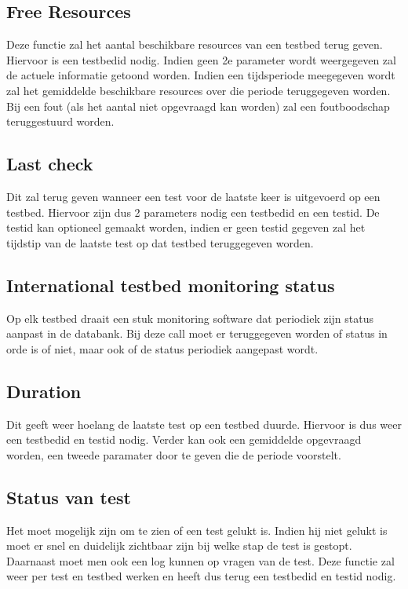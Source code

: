 \documentclass[11pt]{article}
\begin{document}
\subsection{Free Resources}
Deze functie zal het aantal beschikbare resources van een testbed terug geven.
Hiervoor is een testbedid nodig.
Indien geen 2e parameter wordt weergegeven zal de actuele informatie getoond worden.
Indien een tijdsperiode meegegeven wordt zal het gemiddelde beschikbare resources over die periode teruggegeven worden. Bij een fout (als het aantal niet opgevraagd kan worden)
zal een foutboodschap teruggestuurd worden.

\subsection{Last check}
Dit zal terug geven wanneer een test voor de laatste keer is uitgevoerd op een testbed.
Hiervoor zijn dus 2 parameters nodig een testbedid en een testid.
De testid kan optioneel gemaakt worden, indien er geen testid gegeven zal het tijdstip van de laatste test op dat testbed teruggegeven worden.

\subsection{International testbed monitoring status}
Op elk testbed draait een stuk monitoring software dat periodiek zijn status aanpast in de databank.
Bij deze call moet er teruggegeven worden of status in orde is of niet, maar ook of de status periodiek aangepast wordt.

\subsection{Duration}
Dit geeft weer hoelang de laatste test op een testbed duurde.
Hiervoor is dus weer een testbedid en testid nodig.
Verder kan ook een gemiddelde opgevraagd worden, een tweede paramater door te geven die de periode voorstelt.

\subsection{Status van test}
Het moet mogelijk zijn om te zien of een test gelukt is.
Indien hij niet gelukt is moet er snel en duidelijk zichtbaar zijn bij welke stap de test is gestopt. Daarnaast moet men ook een log kunnen op vragen van de test.
Deze functie zal weer per test en testbed werken en heeft dus terug een testbedid en testid nodig.
\end{document}
